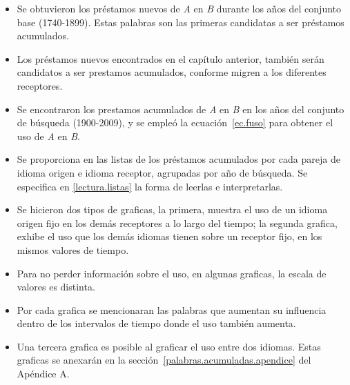 \begin{itemize}
	
	\item Se obtuvieron los préstamos nuevos de \textit{A} en \textit{B} durante los años del conjunto base (1740-1899). Estas palabras son las primeras candidatas a ser préstamos acumulados.
	
	\item Los préstamos nuevos encontrados en el capítulo anterior, también serán candidatos a ser prestamos acumulados, conforme migren a los diferentes receptores.
	
	\item Se encontraron los prestamos acumulados de \textit{A} en \textit{B} en los años del conjunto de búsqueda (1900-2009), y  se empleó la ecuación~\ref{ec.fuso} para obtener el uso de \textit{A} en \textit{B}.
	
	\item Se proporciona en \cite{prestamos_acumulados} las listas de los préstamos acumulados por cada pareja de idioma origen e idioma receptor, agrupadas por año de búsqueda. Se especifica en \ref{lectura.listas} la forma de leerlas e interpretarlas. 
	
	\item Se hicieron dos tipos de graficas, la primera, muestra el uso de un idioma origen fijo en los demás receptores a lo largo del tiempo; la segunda grafica, exhibe el uso que los demás idiomas tienen sobre un receptor fijo, en los mismos valores de tiempo. 
	
	\item Para  no perder información sobre el uso, en algunas graficas, la escala de valores es distinta.
	
	\item Por cada grafica se mencionaran las palabras que aumentan su influencia  dentro de los intervalos de tiempo donde el uso también aumenta. 
	
	\item Una tercera grafica es posible al graficar el uso entre dos idiomas. Estas graficas se anexarán en la sección~\ref{palabras.acumuladas.apendice} del Apéndice A.
	
	
\end{itemize}

